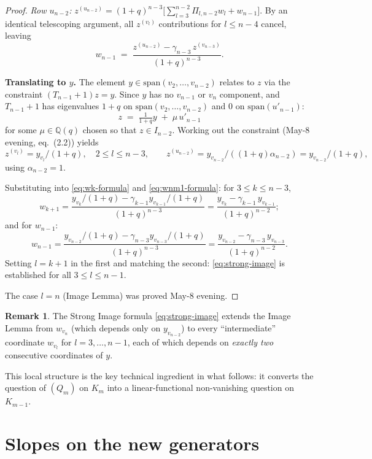 \documentclass[11pt]{article}
\theoremstyle{definition}
\newtheorem{remark}[theorem]{Remark}
\begin{document}
\begin{proof}
\emph{Row $u_{n-2}$:} $z^{(u_{n-2})} =
(1+q)^{n-3}\bigl[\sum_{l=3}^{n-2}\Pi_{l,n-2} w_l + w_{n-1}\bigr]$.
By an identical telescoping argument, all $z^{(v_l)}$ contributions
for $l \le n-4$ cancel, leaving
\begin{equation}\label{eq:wnm1-formula}
   w_{n-1} \;=\; \frac{z^{(u_{n-2})} - \gamma_{n-3}\, z^{(v_{n-3})}}{(1+q)^{n-3}}.
\end{equation}

\medskip
\textbf{Translating to $y$.}  The element $y \in
\mathrm{span}(v_2,\ldots,v_{n-2})$ relates to $z$ via the constraint
$(T_{n-1}{+}1) z = y$.  Since $y$ has no $v_{n-1}$ or $v_n$
component, and $T_{n-1}{+}1$ has eigenvalues $1+q$ on
$\mathrm{span}(v_2,\ldots,v_{n-2})$ and $0$ on $\mathrm{span}(u'_{n-1})$:
\[
   z \;=\; \tfrac{1}{1+q} y \;+\; \mu\, u'_{n-1}
\]
for some $\mu \in \mathbb{Q}(q)$ chosen so that $z \in I_{n-2}$.
Working out the constraint (May-8 evening, eq.~(2.2)) yields
\[
   z^{(v_l)} = y_{v_l}/(1+q),\quad 2 \le l \le n-3, \qquad
   z^{(u_{n-2})} = y_{v_{n-2}}/((1+q)\alpha_{n-2}) = y_{v_{n-2}}/(1+q),
\]
using $\alpha_{n-2} = 1$.

Substituting into \eqref{eq:wk-formula} and \eqref{eq:wnm1-formula}:
for $3 \le k \le n-3$,
\[
   w_{k+1} = \frac{y_{v_k}/(1+q) - \gamma_{k-1} y_{v_{k-1}}/(1+q)}{(1+q)^{n-3}}
           = \frac{y_{v_k} - \gamma_{k-1}\, y_{v_{k-1}}}{(1+q)^{n-2}};
\]
and for $w_{n-1}$:
\[
   w_{n-1} = \frac{y_{v_{n-2}}/(1+q) - \gamma_{n-3} y_{v_{n-3}}/(1+q)}{(1+q)^{n-3}}
           = \frac{y_{v_{n-2}} - \gamma_{n-3}\, y_{v_{n-3}}}{(1+q)^{n-2}}.
\]
Setting $l = k+1$ in the first and matching the second: \eqref{eq:strong-image} is established for all $3 \le l \le n-1$.

The case $l = n$ (Image Lemma) was proved May-8 evening.
\end{proof}

\begin{remark}\label{rem:scope}
The Strong Image formula \eqref{eq:strong-image} extends the Image
Lemma from $w_{v_n}$ (which depends only on $y_{v_{n-2}}$) to every
``intermediate'' coordinate $w_{v_l}$ for $l = 3,\ldots,n-1$, each of
which depends on \emph{exactly two} consecutive coordinates of $y$.

This local structure is the key technical ingredient in what
follows: it converts the question of $(Q_m)$ on $K_m$ into a
linear-functional non-vanishing question on $K_{m-1}$.
\end{remark}

\section{Slopes on the new generators}\label{sec:slopes}
\end{document}

